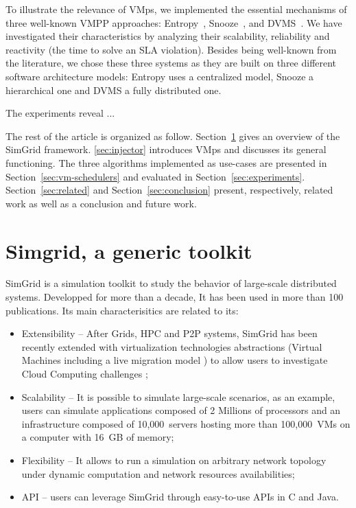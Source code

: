 \documentclass[conference]{IEEEtran}
\newcommand{\sg}{SimGrid\xspace}
\newcommand{\vmps}{VMps\xspace}
\begin{document}
To illustrate the relevance of \vmps, we implemented the essential
mechanisms of three well-known VMPP approaches:
Entropy~\cite{Hermenier:2009:ECM:1508293.1508300},
Snooze~\cite{feller:ccgrid12}, and DVMS~\cite{quesnel:cpe2012}. We
have investigated their characteristics by analyzing their
scalability, reliability and reactivity (\ie the time to solve an SLA
violation). Besides being well-known from the literature, we chose
these three systems as they are built on three different software
architecture models: Entropy uses a centralized model, Snooze a
hierarchical one and DVMS a fully distributed one.

The experiments reveal ...

The rest of the article is organized as follow. Section~\ref{sec:sg}
gives an overview of the \sg framework.  \ref{sec:injector} introduces
\vmps and discusses its general functioning.  The three algorithms
implemented as use-cases are presented in
Section~\ref{sec:vm-schedulers} and evaluated in
Section~\ref{sec:experiments}.  Section~\ref{sec:related} and
Section~\ref{sec:conclusion} present, respectively, related work as
well as a conclusion and future work.

\section{Simgrid, a generic toolkit}
\label{sec:sg}

\sg is a simulation toolkit to study the behavior of
large-scale distributed systems.  Developped for more than  a decade, It has been used in more than 100
publications.  Its main characterisitics are related to its:
\begin{itemize}
\item Extensibility -- After Grids, HPC and P2P
  systems, \sg has been recently extended with virtualization technologies abstractions
(\ie Virtual Machines including a live migration model \cite{Hirofuchi:2013:ALM:2568486.2568524}) to allow users to investigate Cloud
Computing challenges \cite{lucas:cloud2014};
\item Scalability -- It is possible to simulate large-scale scenarios,
  as an example, users can simulate applications composed of 2
  Millions of processors and an infrastructure composed of 10,000~servers hosting more than
  100,000~VMs on a computer with 16~GB of memory;
\item  Flexibility -- It allows to run a simulation on arbitrary network
  topology under dynamic computation and network resources
  availabilities;
\item API --  users can leverage \sg through easy-to-use APIs in C
  and Java.
\end{itemize}
\end{document}
